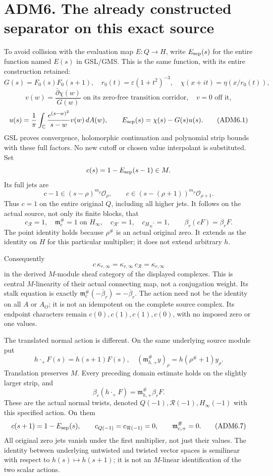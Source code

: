 \section{ADM6. The already constructed separator on this exact
source}\label{adm6.-the-already-constructed-separator-on-this-exact-source}

To avoid collision with the evaluation map \(E:Q\to H\), write
\(E_{\rm sep}(s)\) for the entire function named \(E(s)\) in GSL/GMS.
This is the same function, with its entire construction retained: \[
G(s)=F_0(s)F_0(s+1),\quad r_0(t)=\varepsilon(1+t^2)^{-3},
\quad\chi(x+it)=\eta(x/r_0(t)),
\] \[
v(w)=\frac{\bar\partial\chi(w)}{G(w)}
\text{ on its zero-free transition corridor},\quad v=0\text{ off it},
\] \[
u(s)=\frac1\pi\int_{\mathbb C}\frac{e^{(s-w)^2}}{s-w}v(w)\,dA(w),
\qquad E_{\rm sep}(s)=\chi(s)-G(s)u(s).
\tag{ADM6.1}
\] GSL proves convergence, holomorphic continuation and polynomial strip
bounds with these full factors. No new cutoff or chosen value
interpolant is substituted. Set \[
c(s)=1-E_{\rm sep}(s-1)\in M.
\] Its full jets are \[
c-1\in(s-\rho)^{m_\rho}\mathcal O_\rho,\qquad
c\in(s-(\rho+1))^{m_\rho}\mathcal O_{\rho+1}.
\tag{ADM6.2}
\] Thus \(c=1\) on the entire original \(Q\), including all higher jets.
It follows on the actual source, not only its finite blocks, that \[
c_{\mathcal R}=1,\quad
\mathfrak m_c^\#=1\text{ on }H_\infty,\quad
c_{\mathcal R'}=1,\quad c_{H_\infty'}=1,\qquad
\beta_r(cF)=\beta_rF.
\tag{ADM6.3}
\] The point identity holds because \(\rho^\#\) is an actual original
zero. It extends as the identity on \(H\) for this particular
multiplier; it does not extend arbitrary \(h\).

Consequently \[
c\,\kappa_{r,\infty}
=\kappa_{r,\infty}\,c_{\mathcal R}
=\kappa_{r,\infty}
\tag{ADM6.4}
\] in the derived \(M\)-module sheaf category of the displayed
complexes. This is central \(M\)-linearity of their actual connecting
map, not a conjugation weight. Its stalk equation is exactly
\(\mathfrak m_c^\#(-\overline\beta_r)=-\overline\beta_r\). The action
need not be the identity on all \(A\) or \(A_O\); it is not an
idempotent on the complete source complex. Its endpoint characters
remain \(c(0),c(1),c(1),c(0)\), with no imposed zero or one values.

The translated normal action is different. On the same underlying source
module put \[
h\cdot_{+}F(s)=h(s+1)F(s),\quad
(\mathfrak m_{h,+}^\#y)_\rho=h(\rho^\#+1)y_\rho.
\tag{ADM6.5}
\] Translation preserves \(M\). Every preceding domain estimate holds on
the slightly larger strip, and \[
\beta_r(h\cdot_+F)=\mathfrak m_{h,+}^\#\beta_rF.
\tag{ADM6.6}
\] These are the actual normal twists, denoted
\(Q(-1),\mathcal R(-1),H_\infty(-1)\) with this specified action. On
them \[
c(s+1)=1-E_{\rm sep}(s),\qquad
c_{Q(-1)}=c_{\mathcal R(-1)}=0,\qquad
\mathfrak m_{c,+}^\#=0 .
\tag{ADM6.7}
\] All original zero jets vanish under the first multiplier, not just
their values. The identity between underlying untwisted and twisted
vector spaces is semilinear with respect to \(h(s)\mapsto h(s+1)\); it
is not an \(M\)-linear identification of the two scalar actions.

